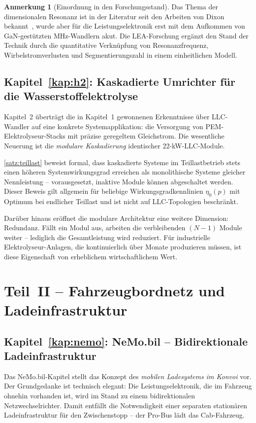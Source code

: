 ﻿\documentclass[a4paper,12pt,openany,oneside]{book}
\newcommand{\abschnitt}[1]{\section{#1}}
\newcommand{\unterabschnitt}[1]{\subsection{#1}}
\theoremstyle{definition}
\newtheorem{bemerkung}{Anmerkung}[chapter]
\begin{document}
\begin{bemerkung}[Einordnung in den Forschungsstand]
  Das Thema der dimensionalen Resonanz ist in der Literatur seit den Arbeiten von Dixon
  bekannt~\cite{Dixon2001}, wurde aber f\"ur die Leistungselektronik erst mit dem Aufkommen
  von GaN-gest\"utzten MHz-Wandlern akut. Die LEA-Forschung erg\"anzt den Stand der Technik
  durch die quantitative Verkn\"upfung von Resonanzfrequenz, Wirbelstromverlusten und
  Segmentierungszahl in einem einheitlichen Modell.
\end{bemerkung}

\unterabschnitt{Kapitel~\ref{kap:h2}: Kaskadierte Umrichter f\"ur die Wasserstoffelektrolyse}

Kapitel~2 \"ubertr\"agt die in Kapitel~1 gewonnenen Erkenntnisse \"uber LLC-Wandler auf
eine konkrete Systemapplikation: die Versorgung von PEM-Elektrolyseur-Stacks mit pr\"azise
geregeltem Gleichstrom. Die wesentliche Neuerung ist die \emph{modulare Kaskadierung}
identischer 22-kW-LLC-Module.

\autoref{satz:teillast} beweist formal, dass kaskadierte Systeme im Teillastbetrieb
stets einen h\"oheren Systemwirkungsgrad erreichen als monolithische Systeme gleicher
Nennleistung -- vorausgesetzt, inaktive Module k\"onnen abgeschaltet werden. Dieser
Beweis gilt allgemein f\"ur beliebige Wirkungsgradkennlinien $\eta_0(p)$ mit
Optimum bei endlicher Teillast und ist nicht auf LLC-Topologien beschr\"ankt.

Dar\"uber hinaus er\"offnet die modulare Architektur eine weitere Dimension: Redundanz.
F\"allt ein Modul aus, arbeiten die verbleibenden $(N-1)$ Module weiter -- lediglich
die Gesamtleistung wird reduziert. F\"ur industrielle Elektrolyseur-Anlagen, die
kontinuierlich \"uber Monate produzieren m\"ussen, ist diese Eigenschaft von
erheblichem wirtschaftlichem Wert.

\abschnitt{Teil~II -- Fahrzeugbordnetz und Ladeinfrastruktur}

\unterabschnitt{Kapitel~\ref{kap:nemo}: NeMo.bil -- Bidirektionale Ladeinfrastruktur}

Das NeMo.bil-Kapitel stellt das Konzept des \emph{mobilen Ladesystems im Konvoi} vor.
Der Grundgedanke ist technisch elegant: Die Leistungselektronik, die im Fahrzeug
ohnehin vorhanden ist, wird im Stand zu einem bidirektionalen Netzwechselrichter.
Damit entf\"allt die Notwendigkeit einer separaten stationären Ladeinfrastruktur f\"ur
den Zwischenstopp -- der Pro-Bus l\"adt das Cab-Fahrzeug.
\end{document}
